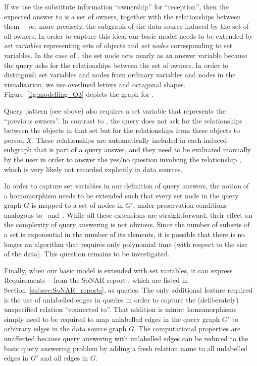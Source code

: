If we use the substitute information \enquote{ownership} for \enquote{reception},
then the expected answer to  is a set of owners,
together with the relationships between them---%
or, more precisely, the subgraph of the data source induced by the set of all owners.
In order to capture this idea,
our basic model needs to be extended by \emph{set variables} representing sets of objects
and \emph{set nodes} corresponding to set variables.
In the case of , the set node acts nearly as an answer variable
because the query asks for the relationships between the set of owners.
In order to distinguish set variables and nodes from ordinary variables and nodes in the visualisation,
we use overlined letters and octagonal shapes.
Figure~\ref{fig:modelling_Q3} depicts the graph for .

Query pattern  (see above) also requires a set variable
that represents the \enquote{previous owners}. In contrast to ,
the query does not ask for the relationships between the objects in that set
but for the relationships from these objects to person $X$.
These relationships are automatically included in each induced subgraph that is part of a query answer,
and they need to be evaluated manually by the user
in order to answer the yes/no question involving the relationship ,
which is very likely not recorded explicitly in data sources.

In order to capture set variables in our definition of query answers,
the notion of a homomorphism needs to be extended such that
every set node in the query graph $G$ is mapped to a set of nodes in $G'$,
under preservation conditions analogous to~ and~.
While all these extensions are straightforward,
their effect on the complexity of query answering is not obvious.
Since the number of subsets of a set is exponential in the number of its
elements, it is possible that there is no longer an algorithm
that requires only polynomial time (with respect to the size of the data).
This question remains to be investigated.

Finally, when our basic model is extended with set variables,
it can express Requirements -- from the 
SoNAR report \autocite{Fangerau2022}, which are listed in Section~\ref{subsec:SoNAR_reports},
as queries.
The only additional feature required is the use of unlabelled edges in queries
in order to capture the (deliberately) unspecified relation \enquote{connected to}.
That addition is minor: homomorphisms simply need to be required to map unlabelled
edges in the query graph $G'$ to arbitrary edges in the data source graph $G$.
The computational properties are unaffected because 
query answering with unlabelled edges can be reduced to the basic query answering problem
by adding a fresh relation name to all unlabelled edges in $G'$ and all edges in $G$.

